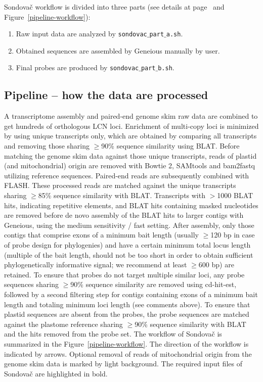\documentclass[a4paper, 11pt, twoside]{article}
\begin{document}
Sondovač workflow is divided into three parts (see details at page~\pageref{pipeline-overview} and Figure~\ref{pipeline-workflow}):

\begin{enumerate}
\item Raw input data are analyzed by \texttt{sondovac$\_$part$\_$a.sh}.
\item Obtained sequences are assembled by Geneious manually by user.
\item Final probes are produced by \texttt{sondovac$\_$part$\_$b.sh}.
\end{enumerate}

\subsection{Pipeline -- how the data are processed}

A transcriptome assembly and paired-end genome skim raw data are combined to get hundreds of orthologous LCN loci. Enrichment of multi-copy loci is minimized by using unique transcripts only, which are obtained by comparing all transcripts and removing those sharing $\geq$90\% sequence similarity using BLAT. Before matching the genome skim data against those unique transcripts, reads of plastid (and mitochondrial) origin are removed with Bowtie 2, SAMtools and bam2fastq utilizing reference sequences. Paired-end reads are subsequently combined with FLASH. These processed reads are matched against the unique transcripts sharing $\geq$85\% sequence similarity with BLAT. Transcripts with $>$1000 BLAT hits, indicating repetitive elements, and BLAT hits containing masked nucleotides are removed before de novo assembly of the BLAT hits to larger contigs with Geneious, using the medium sensitivity / fast setting. After assembly, only those contigs that comprise exons of a minimum bait length (usually $\geq$120 bp in case of probe design for phylogenies) and have a certain minimum total locus length (multiple of the bait length, should not be too short in order to obtain sufficient phylogenetically informative signal; we recommend at least $\geq$600 bp) are retained. To ensure that probes do not target multiple similar loci, any probe sequences sharing $\geq$90\% sequence similarity are removed using cd-hit-est, followed by a second filtering step for contigs containing exons of a minimum bait length and totaling minimum loci length (see comments above). To ensure that plastid sequences are absent from the probes, the probe sequences are matched against the plastome reference sharing $\geq$90\% sequence similarity with BLAT and the hits removed from the probe set. The workflow of Sondovač is summarized in the Figure~\ref{pipeline-workflow}. The direction of the workflow is indicated by arrows. Optional removal of reads of mitochondrial origin from the genome skim data is marked by light background. The required input files of Sondovač are highlighted in bold.
\end{document}
